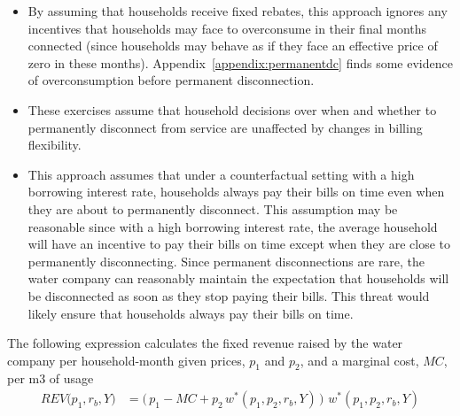 \documentclass[12pt]{article}
\begin{document}
\begin{enumerate}
\begin{itemize}
    \item By assuming that households receive fixed rebates, this approach ignores any incentives that households may face to overconsume in their final months connected (since households may behave as if they face an effective price of zero in these months).  Appendix~\ref{appendix:permanentdc} finds some evidence of overconsumption before permanent disconnection.  

    \item These exercises assume that household decisions over when and whether to permanently disconnect from service are unaffected by changes in billing flexibility.  

    \item This approach assumes that under a counterfactual setting with a high borrowing interest rate, households always pay their bills on time even when they are about to permanently disconnect.  This assumption may be reasonable since with a high borrowing interest rate, the average household will have an incentive to pay their bills on time except when they are close to permanently disconnecting.  Since permanent disconnections are rare, the water company can reasonably maintain the expectation that households will be disconnected as soon as they stop paying their bills.  This threat would likely ensure that households always pay their bills on time.
\end{itemize}    
\end{enumerate}  

The following expression calculates the fixed revenue raised by the water company per household-month given prices, $p_1$ and $p_2$, and a marginal cost, $MC$, per m3 of usage
\begin{align*}
REV \big(p_1,r_b,Y \big) &= \Big ( \,  p_1 - MC +  p_2 \, w^{*}(p_1,p_2,r_b,Y)  \,  \Big ) \, \, w^{*}(p_1,p_2,r_b,Y)
\end{align*}

\end{document}
